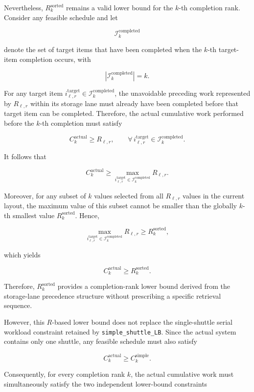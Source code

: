 Nevertheless, \(R_k^{\mathrm{sorted}}\) remains a valid lower bound for the
\(k\)-th completion rank. Consider any feasible schedule and let

\[
\mathcal{I}_k^{\mathrm{completed}}
\]

denote the set of target items that have been completed when the \(k\)-th
target-item completion occurs, with

\[
\left|
\mathcal{I}_k^{\mathrm{completed}}
\right|
=
k.
\]

For any target item
\(i^{\mathrm{target}}_{\ell,r}
\in
\mathcal{I}_k^{\mathrm{completed}}\),
the unavoidable preceding work represented by \(R_{\ell,r}\) within its
storage lane must already have been completed before that target item can be
completed. Therefore, the actual cumulative work performed before the
\(k\)-th completion must satisfy

\[
C_k^{\mathrm{actual}}
\geq
R_{\ell,r},
\qquad
\forall\,
i^{\mathrm{target}}_{\ell,r}
\in
\mathcal{I}_k^{\mathrm{completed}}.
\]

It follows that

\[
C_k^{\mathrm{actual}}
\geq
\max_{
i^{\mathrm{target}}_{\ell,r}
\in
\mathcal{I}_k^{\mathrm{completed}}
}
R_{\ell,r}.
\]

Moreover, for any subset of \(k\) values selected from all
\(R_{\ell,r}\) values in the current layout, the maximum value of this subset
cannot be smaller than the globally \(k\)-th smallest value
\(R_k^{\mathrm{sorted}}\). Hence,

\[
\max_{
i^{\mathrm{target}}_{\ell,r}
\in
\mathcal{I}_k^{\mathrm{completed}}
}
R_{\ell,r}
\geq
R_k^{\mathrm{sorted}},
\]

which yields

\[
C_k^{\mathrm{actual}}
\geq
R_k^{\mathrm{sorted}}.
\]

Therefore, \(R_k^{\mathrm{sorted}}\) provides a completion-rank lower bound
derived from the storage-lane precedence structure without prescribing a
specific retrieval sequence.

However, this \(R\)-based lower bound does not replace the single-shuttle
serial workload constraint retained by \texttt{simple\_shuttle\_LB}. Since the
actual system contains only one shuttle, any feasible schedule must also
satisfy

\[
C_k^{\mathrm{actual}}
\geq
C_k^{\mathrm{simple}}.
\]

Consequently, for every completion rank \(k\), the actual cumulative work must
simultaneously satisfy the two independent lower-bound constraints

